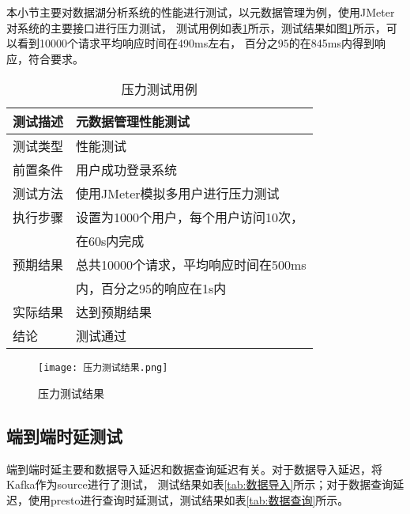 本小节主要对数据湖分析系统的性能进行测试，以元数据管理为例，使用JMeter对系统的主要接口进行压力测试\cite{33}，
测试用例如表\ref{tab:exampletable16}所示，测试结果如图\ref{fig:badge2}所示，可以看到10000个请求平均响应时间在490ms左右，
百分之95的在845ms内得到响应，符合要求。

\begin{table}[H]
  \centering
  \caption{压力测试用例}
  \label{tab:exampletable16}
  \begin{tabular}{ll}
    \toprule
    测试描述         & 元数据管理性能测试         \\
    \midrule
    测试类型         & 性能测试         \\
    前置条件         & 用户成功登录系统         \\
    测试方法         & 使用JMeter模拟多用户进行压力测试        \\
    执行步骤         & 设置为1000个用户，每个用户访问10次，\\
                    &  在60s内完成      \\
    预期结果         & 总共10000个请求，平均响应时间在500ms  \\
                    & 内，百分之95的响应在1s内      \\
    实际结果         & 达到预期结果           \\
    结论            & 测试通过           \\
    \bottomrule
  \end{tabular}
\end{table}

\begin{figure}[H]
  \centering
  \texttt{[image: 压力测试结果.png]}
  \caption{压力测试结果}
  \label{fig:badge2}
\end{figure}

\subsection{端到端时延测试}

端到端时延主要和数据导入延迟和数据查询延迟有关。对于数据导入延迟，将Kafka作为source进行了测试，
测试结果如表\ref{tab:数据导入}所示；对于数据查询延迟，使用presto进行查询时延测试，测试结果如表\ref{tab:数据查询}所示。

